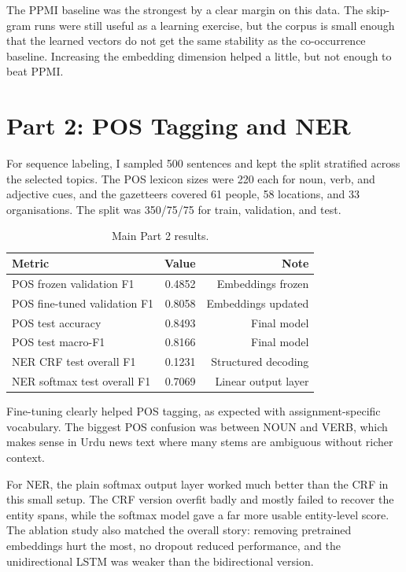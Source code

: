 \documentclass[12pt]{article}
\begin{document}
The PPMI baseline was the strongest by a clear margin on this data. The skip-gram runs were still useful as a learning exercise, but the corpus is small enough that the learned vectors do not get the same stability as the co-occurrence baseline. Increasing the embedding dimension helped a little, but not enough to beat PPMI.

\section{Part 2: POS Tagging and NER}
For sequence labeling, I sampled 500 sentences and kept the split stratified across the selected topics. The POS lexicon sizes were 220 each for noun, verb, and adjective cues, and the gazetteers covered 61 people, 58 locations, and 33 organisations. The split was 350/75/75 for train, validation, and test.

\begin{table}[h]
\centering
\small
\begin{tabular}{@{}lrr@{}}
\toprule
Metric & Value & Note \\
\midrule
POS frozen validation F1 & 0.4852 & Embeddings frozen \\
POS fine-tuned validation F1 & 0.8058 & Embeddings updated \\
POS test accuracy & 0.8493 & Final model \\
POS test macro-F1 & 0.8166 & Final model \\
NER CRF test overall F1 & 0.1231 & Structured decoding \\
NER softmax test overall F1 & 0.7069 & Linear output layer \\
\bottomrule
\end{tabular}
\caption{Main Part 2 results.}
\end{table}

Fine-tuning clearly helped POS tagging, as expected with assignment-specific vocabulary. The biggest POS confusion was between NOUN and VERB, which makes sense in Urdu news text where many stems are ambiguous without richer context.

For NER, the plain softmax output layer worked much better than the CRF in this small setup. The CRF version overfit badly and mostly failed to recover the entity spans, while the softmax model gave a far more usable entity-level score. The ablation study also matched the overall story: removing pretrained embeddings hurt the most, no dropout reduced performance, and the unidirectional LSTM was weaker than the bidirectional version.
\end{document}
